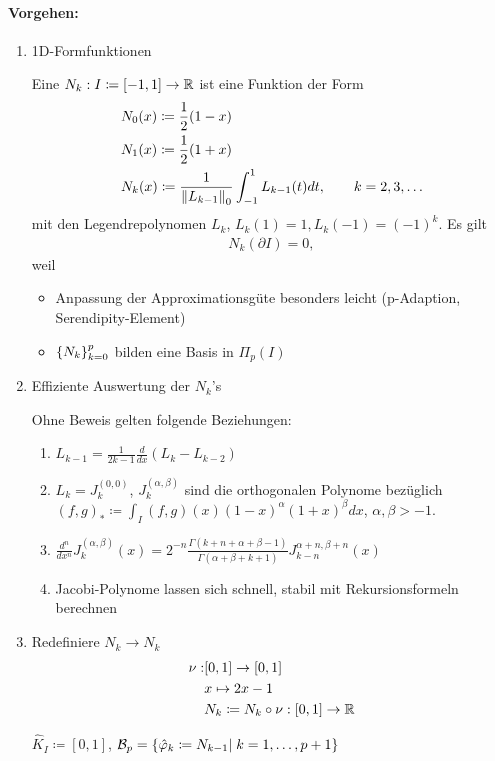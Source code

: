 \paragraph{Vorgehen:}
\begin{enumerate}
\item 1D-Formfunktionen
  \begin{definition*}
    Eine  $N_k : I \coloneqq[-1, 1] \to \mathbb{R}$ ist eine Funktion der Form 
    \begin{align*}
      &N_0(x) \coloneqq \frac 1 2(1 - x)\\
      &N_1(x) \coloneqq \frac 1 2(1 + x)\\
      &N_k(x) \coloneqq   \frac {1}{\left \|L_{k-1} \right\|_0} \int_{-1}^1 L_{k-1}(t) dt, \qquad k = 2, 3, \dots
    \end{align*}
mit den Legendrepolynomen $L_k$, $L_k(1) = 1, L_k(-1) = (-1)^k$. Es gilt
\begin{align*}
  N_k(\partial I) = 0, 
\end{align*}
weil 
  \end{definition*}
  \begin{bemerkung*}
    \begin{itemize}
    \item Anpassung der Approximationsgüte besonders leicht (p-Adaption, Serendipity-Element)
    \item  $\left\{ N_k \right\}_{k = 0}^p$ bilden eine Basis in $\Pi_p(I)$
    \end{itemize}
  \end{bemerkung*}
\item Effiziente Auswertung der $N_k$'s

Ohne Beweis gelten folgende Beziehungen:
  \begin{enumerate}
  \item $L _{k-1} = \frac 1 {2k-1} \frac d {dx}(L_k - L_{k-2})$
  \item $L_k = J_k^{(0, 0)}$, $J_k^{(\alpha, \beta)}$ sind die orthogonalen Polynome bezüglich $(f, g)_* \coloneqq \int_I(f, g)(x)(1- x)^{\alpha}(1+x)^\beta dx$, $\alpha, \beta > -1$. 
\item $\frac {d^n}{dx^n} J_k^{(\alpha, \beta)}(x) =  2^{-n} \frac {\Gamma(k+ n+ \alpha + \beta -1)}{\Gamma(\alpha + \beta + k + 1)} J_{k-n}^{\alpha + n, \beta + n}(x)$
\item Jacobi-Polynome lassen sich schnell, stabil mit Rekursionsformeln berechnen
  \end{enumerate}
\item Redefiniere $N_k \to N_k$
  \begin{align*}
    \nu: &[0, 1] \to [0, 1]\\
    & x \mapsto 2x -1\\
& N_k  \coloneqq N_k \circ \nu: [0, 1] \to \mathbb{R}
  \end{align*}

$\hat K_I \coloneqq[0, 1]$, ${\cal B}_p = \left\{ \hat {\varphi}_k \coloneqq N_{k-1}| \; k = 1, \dots, p+1 \right\}$
 \end{enumerate}
